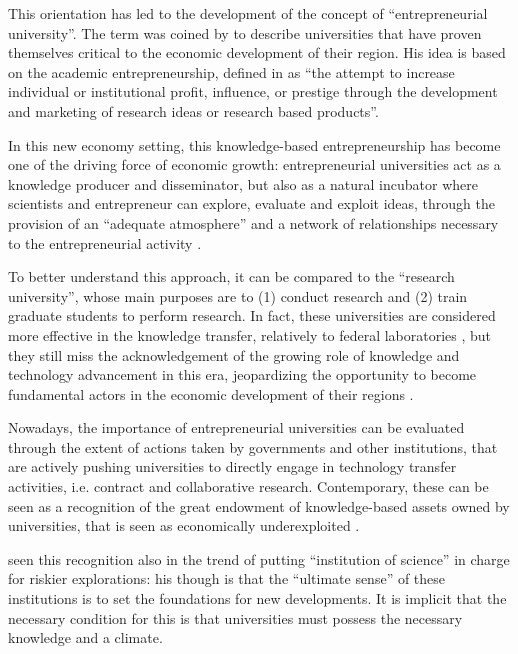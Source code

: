 This orientation has led to the development of the concept of \enquote{entrepreneurial university}. The term was coined by \citet{Etzkowitz1998} to describe universities that have proven themselves critical to the economic development of their region. His idea is based on the academic entrepreneurship, defined in \citet{Louis1989} as \enquote{the attempt to increase individual or institutional profit, influence, or prestige through the development and marketing of research ideas or research based products}.

In this new economy setting, this knowledge-based entrepreneurship has become one of the driving force of economic growth: entrepreneurial universities act as a knowledge producer and disseminator, but also as a natural incubator where scientists and entrepreneur can explore, evaluate and exploit ideas, through the provision of an \enquote{adequate atmosphere} and a network of relationships necessary to the entrepreneurial activity \citep{Guerrero2014}.

To better understand this approach, it can be compared to the \enquote{research university}, whose main purposes are to (1) conduct research and (2) train graduate students to perform research. In fact, these universities are considered more effective in the knowledge transfer, relatively to federal laboratories \citep{Rogers2001}, but they still miss the acknowledgement of the growing role of knowledge and technology advancement in this era, jeopardizing the opportunity to become fundamental actors in the economic development of their regions \citep{OShea2004}.

Nowadays, the importance of entrepreneurial universities can be evaluated through the extent of actions taken by governments and other institutions, that are actively pushing universities to directly engage in technology transfer activities, i.e. contract and collaborative research. Contemporary, these can be seen as a recognition of the great endowment of knowledge-based assets owned by universities, that is seen as economically underexploited \citep{Tijssen2006}. 

\citet{Balconi2006} seen this recognition also in the trend of putting \enquote{institution of science} in charge for riskier explorations: his though is that the \enquote{ultimate sense} of these institutions is to set the foundations for new developments. It is implicit that the necessary condition for this is that universities must possess the necessary knowledge and a climate.

